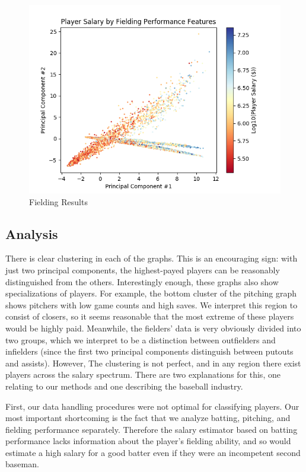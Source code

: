 \documentclass[12pt, letterpaper]{article}
\begin{document}
\begin{figure}[H]
\centering
\includegraphics[scale=0.65]{fielding.png}
\caption{Fielding Results}
\label{field}
\end{figure}

\subsection{Analysis}

There is clear clustering in each of the graphs. This is an encouraging sign: with just two principal components, the highest-payed players can be reasonably distinguished from the others. Interestingly enough, these graphs also show specializations of players. For example, the bottom cluster of the pitching graph shows pitchers with low game counts and high saves. We interpret this region to consist of closers, so it seems reasonable that the most extreme of these players would be highly paid. Meanwhile, the fielders' data is very obviously divided into two groups, which we interpret to be a distinction between outfielders and infielders (since the first two principal components distinguish between putouts and assists). However, The clustering is not perfect, and in any region there exist players across the salary spectrum. There are two explanations for this, one relating to our methods and one describing the baseball industry. 

First, our data handling procedures were not optimal for classifying players. Our most important shortcoming is the fact that we analyze batting, pitching, and fielding performance separately. Therefore the salary estimator based on batting performance lacks information about the player's fielding ability, and so would estimate a high salary for a good batter even if they were an incompetent second baseman.
\end{document}
